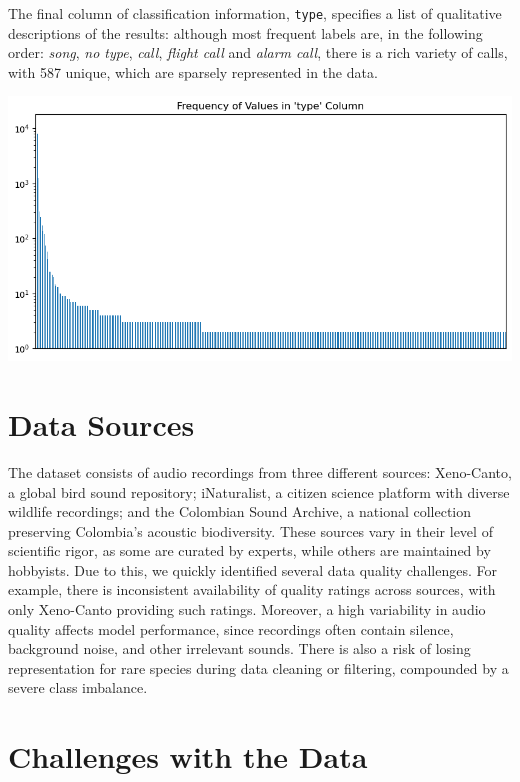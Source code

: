 \documentclass[10pt]{article}
\begin{document}
\begin{minipage}{0.48\linewidth}
The final column of classification information, \texttt{type}, specifies a list of qualitative descriptions of the results: although most frequent labels are, in the following order: \textit{song}, \textit{no type}, \textit{call}, \textit{flight call} and \textit{alarm call}, there is a rich variety of calls, with 587 unique, which are sparsely represented in the data.
\end{minipage}
\hfill
\begin{minipage}{0.48\linewidth}
  \includegraphics[width=\linewidth]{img/train_type_histogram.png}
\end{minipage}

\section*{Data Sources}

The dataset consists of audio recordings from three different sources: Xeno-Canto, a global bird sound repository; iNaturalist, a citizen science platform with diverse wildlife recordings; and the Colombian Sound Archive, a national collection preserving Colombia's acoustic biodiversity. These sources vary in their level of scientific rigor, as some are curated by experts, while others are maintained by hobbyists. Due to this, we quickly identified several data quality challenges. For example, there is inconsistent availability of quality ratings across sources, with only Xeno-Canto providing such ratings. Moreover, a high variability in audio quality affects model performance, since recordings often contain silence, background noise, and other irrelevant sounds. There is also a risk of losing representation for rare species during data cleaning or filtering, compounded by a severe class imbalance.

\section*{Challenges with the Data}
\end{document}
